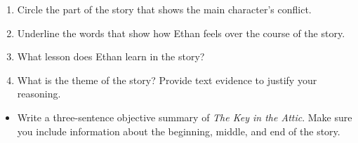 \documentclass[12pt]{article}
\begin{document}
\begin{tcolorbox}[colframe=black!60, colback=white, 
coltitle=black, colbacktitle=black!15, fonttitle=\bfseries\Large, 
title=Independent Practice, halign title=center, left=10pt, right=10pt, top=10pt, bottom=15pt]

\begin{enumerate}[itemsep=1em]
    \item Circle the part of the story that shows the main character's conflict.
    \item Underline the words that show how Ethan feels over the course of the story.
    \item What lesson does Ethan learn in the story? 
    \vspace{3cm}
    \item What is the theme of the story? Provide text evidence to justify your reasoning.
      \vspace{3cm}
\end{enumerate}
\end{tcolorbox}
  \vspace{1em}
\begin{tcolorbox}[colframe=black!60, colback=white, 
coltitle=black, colbacktitle=black!15, fonttitle=\bfseries\Large, 
title=Exit Ticket, halign title=center, left=10pt, right=10pt, top=10pt, bottom=15pt]
\textbf{}
\begin{itemize}
    \item Write a three-sentence objective summary of \textit{The Key in the Attic}. Make sure you include information about the beginning, middle, and end of the story.
      \vspace{5cm}
\end{itemize}
\end{tcolorbox}
\end{document}

